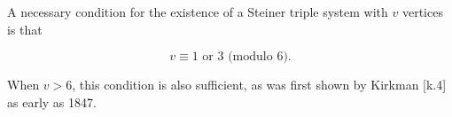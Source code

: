 A necessary condition for the existence of a Steiner triple system with $v$ vertices is that

$$v \equiv 1 \text{ or } 3 \text{ (modulo } 6).$$

When $v > 6$, this condition is also sufficient, as was first shown by Kirkman [k.4] as early as 1847.
